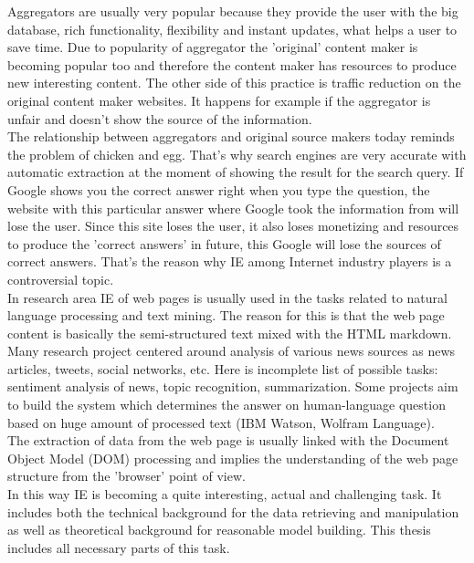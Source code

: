 Aggregators are usually very popular because they provide the user with the big database, rich functionality, flexibility and instant updates, what helps a user to save time. Due to popularity of aggregator the 'original' content maker is becoming popular too and therefore the content maker has resources to produce new interesting content. The other side of this practice is traffic reduction on the original content maker websites. It happens for example if the aggregator is unfair and doesn't show the source of the information. \\

The relationship between aggregators and original source makers today reminds the problem of chicken and egg. That's why search engines are very accurate with automatic extraction at the moment of showing the result for the search query. If Google shows you the correct answer right when you type the question, the website with this particular answer where Google took the information from will lose the user. Since this site loses the user, it also loses monetizing and resources to produce the 'correct answers' in future, this Google will lose the sources of correct answers. That's the reason why IE among Internet industry players is  a controversial topic.\\

In research area IE of web pages is usually used in the tasks related to natural language processing and text mining. The reason for this is that the web page content is basically the semi-structured text mixed with the HTML markdown. Many research project centered around analysis of various news sources as news articles, tweets, social networks, etc. Here is incomplete list of possible tasks: sentiment analysis of news, topic recognition, summarization. Some projects aim to build the system which determines the answer on human-language question based on huge amount of processed text (IBM Watson, Wolfram Language).\\      

The extraction of data from the web page is usually linked with the Document Object Model (DOM) processing and implies the understanding of the web page structure from the 'browser' point of view. \\

In this way IE is becoming a quite interesting, actual and challenging task. It includes both the technical background for the data retrieving and manipulation as well as theoretical background for reasonable model building. This thesis includes all necessary parts of this task.

